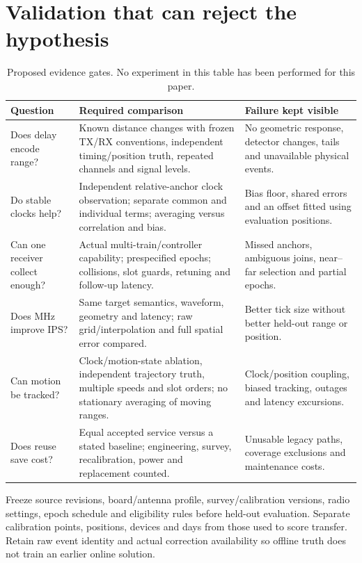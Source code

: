 \documentclass[11pt,letterpaper]{article}
\begin{document}
\section{Validation that can reject the hypothesis}\label{sec:validation}
\begin{table}[ht]\centering\small
\caption{Proposed evidence gates. No experiment in this table has been performed for this paper.}\label{tab:gates}
\begin{tabular}{@{}L{29mm}L{67mm}L{49mm}@{}}\toprule
Question & Required comparison & Failure kept visible\\\midrule
Does delay encode range? &Known distance changes with frozen TX/RX conventions, independent timing/position truth, repeated channels and signal levels. &No geometric response, detector changes, tails and unavailable physical events.\\\addlinespace
Do stable clocks help? &Independent relative-anchor clock observation; separate common and individual terms; averaging versus correlation and bias. &Bias floor, shared errors and an offset fitted using evaluation positions.\\\addlinespace
Can one receiver collect enough? &Actual multi-train/controller capability; prespecified epochs; collisions, slot guards, retuning and follow-up latency. &Missed anchors, ambiguous joins, near--far selection and partial epochs.\\\addlinespace
Does MHz improve IPS? &Same target semantics, waveform, geometry and latency; raw grid/interpolation and full spatial error compared. &Better tick size without better held-out range or position.\\\addlinespace
Can motion be tracked? &Clock/motion-state ablation, independent trajectory truth, multiple speeds and slot orders; no stationary averaging of moving ranges. &Clock/position coupling, biased tracking, outages and latency excursions.\\\addlinespace
Does reuse save cost? &Equal accepted service versus a stated baseline; engineering, survey, recalibration, power and replacement counted. &Unusable legacy paths, coverage exclusions and maintenance costs.\\\bottomrule
\end{tabular}
\end{table}

Freeze source revisions, board/antenna profile, survey/calibration versions, radio settings, epoch schedule and eligibility rules before held-out evaluation. Separate calibration points, positions, devices and days from those used to score transfer. Retain raw event identity and actual correction availability so offline truth does not train an earlier online solution.
\end{document}
